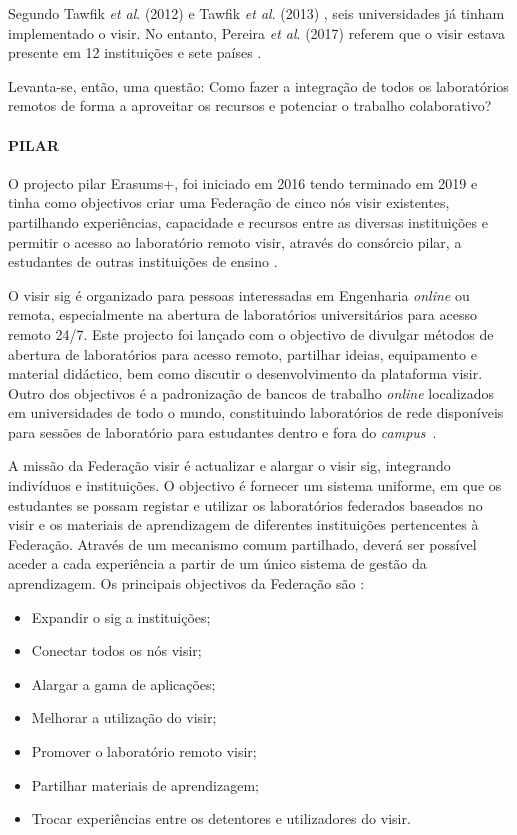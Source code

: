 Segundo Tawfik \textit{et al}. (2012) \cite{tawfikexperiences} e Tawfik \textit{et al}. (2013) \cite{tawfikvisir}, seis universidades já tinham implementado o \acrshort{visir}. No entanto, Pereira \textit{et al}. (2017) referem que o \acrshort{visir} estava presente em 12 instituições e sete países \cite{pereira}.

Levanta-se, então, uma questão: Como fazer a integração de todos os laboratórios remotos de forma a aproveitar os recursos e potenciar o trabalho colaborativo?

\paragraph{PILAR}
O projecto \acrfull{pilar} Erasums+, foi iniciado em 2016 tendo terminado em 2019 e tinha como objectivos criar uma Federação de cinco nós \acrshort{visir} existentes, partilhando experiências, capacidade e recursos entre as diversas instituições e permitir o acesso ao laboratório remoto \acrshort{visir}, através do consórcio \acrshort{pilar}, a estudantes de outras instituições de ensino \cite{garcia-loro}.

O \acrshort{visir} \acrfull{sig} é organizado para pessoas interessadas em Engenharia \textit{online} ou remota, especialmente na abertura de laboratórios universitários para acesso remoto 24/7. Este projecto foi lançado com o objectivo de divulgar métodos de abertura de laboratórios para acesso remoto,  partilhar ideias, equipamento e material didáctico, bem como discutir o desenvolvimento da plataforma \acrshort{visir}. Outro dos objectivos é a padronização de bancos de trabalho \textit{online} localizados em universidades de todo o mundo, constituindo laboratórios de rede disponíveis para sessões de laboratório para estudantes dentro e fora do \textit{campus}~\cite{visirsig}.

A missão da Federação \acrshort{visir} é actualizar e alargar o \acrshort{visir} \acrshort{sig}, integrando indivíduos e instituições. O objectivo é fornecer um sistema uniforme, em que os estudantes se possam registar e utilizar os laboratórios federados baseados no \acrshort{visir} e os materiais de aprendizagem de diferentes instituições pertencentes à Federação. Através de um mecanismo comum partilhado, deverá ser possível aceder a cada experiência a partir de um único sistema de gestão da aprendizagem. Os principais objectivos da Federação são \cite{visirfederation}:
\begin{itemize}
    \item Expandir o \acrshort{sig} a instituições;
    \item Conectar todos os nós \acrshort{visir};
    \item Alargar a gama de aplicações;
    \item Melhorar a utilização do \acrshort{visir};
    \item Promover o laboratório remoto \acrshort{visir};
    \item Partilhar materiais de aprendizagem;
    \item Trocar experiências entre os detentores e utilizadores do \acrshort{visir}.
\end{itemize}

